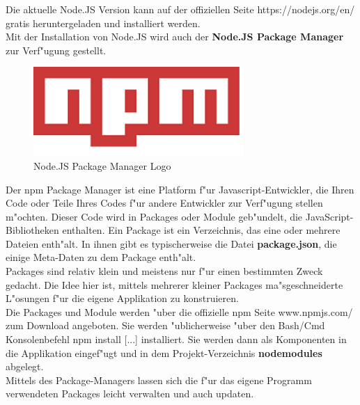 \documentclass[a4paper, 11pt]{scrreprt}
\begin{document}
Die aktuelle Node.JS Version kann auf der offiziellen Seite https://nodejs.org/en/ gratis heruntergeladen und installiert werden.\\

Mit der Installation von Node.JS wird auch der \textbf{Node.JS Package Manager} zur Verf"ugung gestellt.\\

\begin{figure} [h]
\begin{center}


\includegraphics[width=8cm]{npm.png}
\caption{Node.JS Package Manager Logo}
\label{npm}

\end{center}
\end{figure}


Der npm Package Manager ist eine Platform f"ur Javascript-Entwickler, die Ihren Code oder Teile Ihres Codes f"ur andere Entwickler zur Verf"ugung stellen m"ochten. Dieser Code wird in Packages oder Module geb"undelt, die JavaScript-Bibliotheken enthalten. Ein Package ist ein Verzeichnis, das eine oder mehrere Dateien enth"alt. In ihnen gibt es typischerweise die Datei \textbf{package.json}, die einige Meta-Daten zu dem Package enth"alt. \\

Packages sind relativ klein und meistens nur f"ur einen bestimmten Zweck gedacht. Die Idee hier ist, mittels mehrerer kleiner  Packages ma"sgeschneiderte L"osungen f"ur die eigene Applikation zu konstruieren. \\

Die Packages und Module werden "uber die offizielle npm Seite www.npmjs.com/ zum Download angeboten. Sie werden "ublicherweise "uber den Bash/Cmd Konsolenbefehl npm install [...] installiert. Sie werden dann als Komponenten in die Applikation eingef"ugt und in dem Projekt-Verzeichnis \textbf{nodemodules} abgelegt.\\

Mittels des Package-Managers lassen sich die f"ur das eigene Programm verwendeten Packages leicht verwalten und auch updaten. \\
\end{document}

